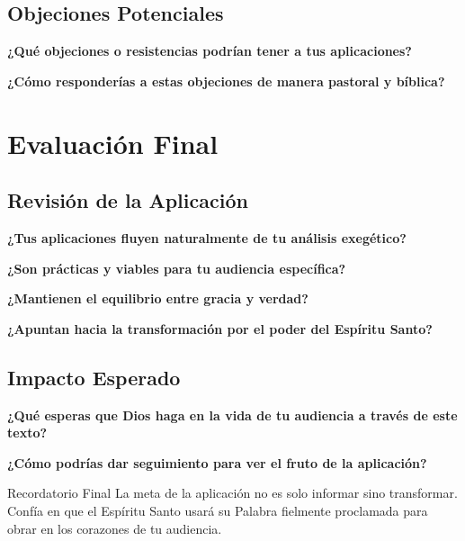 \documentclass[11pt,a4paper]{article}
\begin{document}
\subsection{Objeciones Potenciales}

\textbf{¿Qué objeciones o resistencias podrían tener a tus aplicaciones?}
\vspace{3cm}

\textbf{¿Cómo responderías a estas objeciones de manera pastoral y bíblica?}
\vspace{3cm}

\section{Evaluación Final}

\subsection{Revisión de la Aplicación}

\textbf{¿Tus aplicaciones fluyen naturalmente de tu análisis exegético?}
\vspace{2cm}

\textbf{¿Son prácticas y viables para tu audiencia específica?}
\vspace{2cm}

\textbf{¿Mantienen el equilibrio entre gracia y verdad?}
\vspace{2cm}

\textbf{¿Apuntan hacia la transformación por el poder del Espíritu Santo?}
\vspace{2cm}

\subsection{Impacto Esperado}

\textbf{¿Qué esperas que Dios haga en la vida de tu audiencia a través de este texto?}
\vspace{3cm}

\textbf{¿Cómo podrías dar seguimiento para ver el fruto de la aplicación?}
\vspace{3cm}

\begin{infobox}{Recordatorio Final}
La meta de la aplicación no es solo informar sino transformar. Confía en que el Espíritu Santo usará su Palabra fielmente proclamada para obrar en los corazones de tu audiencia.
\end{infobox}
\end{document}
